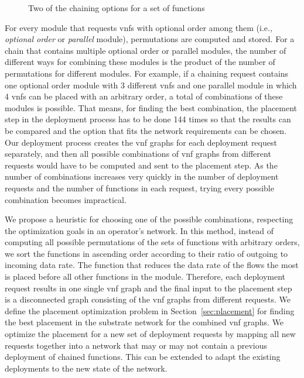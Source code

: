 \documentclass[10pt,a4paper,conference]{IEEEtran}
\begin{document}
\begin{figure}[!t]
\hfil
{}
\caption{Two of the chaining options for a set of functions}
\label{fig:lb}
\vspace{-3mm}
\end{figure}

For every module that requests  \acp{vnf} with 
optional order among them (i.e., \emph{optional order} or \emph{parallel} module), 
 permutations are computed and stored. For a 
chain that contains multiple optional order or parallel modules, the number of 
different ways for combining these modules is the product of the number of 
permutations for different modules. For example, if a chaining request contains 
one optional order module with 3 different \acp{vnf} and one parallel module in which 
4 \acp{vnf} can be placed with an arbitrary order, a total of  
combinations of these modules is possible. That means, for finding the best combination,
the placement step in the deployment process has to be done 144 times so that the 
results can be compared and the option that fits the network requirements can be
chosen. Our deployment process creates the \ac{vnf} graphs for each deployment 
request separately, and then all possible combinations of \ac{vnf} graphs from 
different requests would have to be computed and sent to the placement step. As the number 
of combinations increases very quickly in the number of deployment requests and  
the number of functions in each request, trying every possible combination
becomes impractical. 

We propose a heuristic for choosing one of the possible combinations, respecting
the optimization goals in an operator's network. In this method, instead of computing
all possible permutations of the sets of functions with arbitrary orders, we 
sort the functions in ascending order according to their ratio of outgoing to
incoming data rate. The function that reduces the data rate of the flows the most 
is placed before all other functions in the module. Therefore, each deployment 
request results in one single \ac{vnf} graph and the final input to the placement
step is a disconnected graph consisting of the \ac{vnf} graphs from different requests.
We define the placement optimization problem in Section~\ref{sec:placement} for 
finding the best placement in the substrate network for the combined \ac{vnf} graphs.
We optimize the placement for a new set of deployment requests by mapping all new 
requests together into a network that may or may not contain a previous deployment of chained 
functions. This can be extended to adapt the existing deployments to the new 
state of the network.
\end{document}
